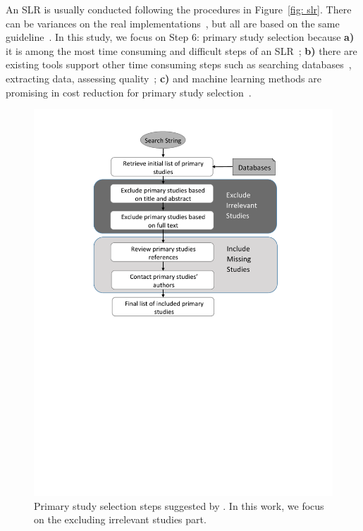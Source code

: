 \documentclass[final,twocolumn,5p]{elsarticle}
\theoremstyle{break}
\begin{document}
An SLR is usually conducted following the procedures in Figure~\ref{fig: slr}. There can be variances on the real
implementations~\cite{wahono2015systematic,malhotra2015systematic,radjenovic2013software,unterkalmsteiner2012evaluation,hall2012systematic},
but all are based on the same guideline~\cite{keele2007guidelines}. In this
study, we focus on Step 6: primary study selection because \textbf{a)} it is among the most time consuming and difficult steps of an SLR~\cite{carver2013identifying}; \textbf{b)} there are existing tools support other time consuming steps such as searching databases~\cite{Molleri:2015:SWA:2745802.2745825,hernandes2012using}, extracting data\cite{Molleri:2015:SWA:2745802.2745825,hernandes2012using,fernandez2010slr,bowes2012slurp}, assessing quality~\cite{fernandez2010slr,bowes2012slurp,Molleri:2015:SWA:2745802.2745825}; \textbf{c)} and machine learning methods are promising in cost reduction for primary study selection~\cite{wallace2010semi,grossman2013}.

 

\begin{figure}[!ht]
    \centering
    \includegraphics[width=\linewidth]{primary_study_selection.pdf}
    \caption{Primary study selection steps suggested by \cite{keele2007guidelines}. In this work, we focus on the excluding irrelevant studies part.}
    \label{fig: prime}
\end{figure}
\end{document}
